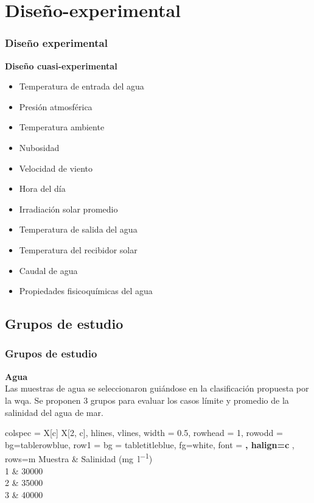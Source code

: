 \section{Diseño-experimental}
\begin{frame}
    \frametitle{Diseño experimental}
    \vspace*{2mm}
    \textbf{\large Diseño cuasi-experimental}\\[5mm]
    
    \begin{itemize}[columns=2]
	    \item Temperatura de entrada del agua
	    \item Presión atmosférica
	    \item Temperatura ambiente
	    \item Nubosidad
	    \item Velocidad de viento
	    \item Hora del día
	    \item Irradiación solar promedio
	    \item Temperatura de salida del agua
	    \item Temperatura del recibidor solar
	    \item Caudal de agua
	    \item Propiedades fisicoquímicas del agua
    \end{itemize}
\end{frame}

	\subsection{Grupos de estudio}

	\begin{frame}
	    \frametitle{Grupos de estudio}
	    \vspace*{2mm}
	    \textbf{\large Agua}\\[5mm]  
	    
	    Las muestras de agua se seleccionaron guiándose en la clasificación propuesta por la \acrfull{wqa}. Se proponen 3 grupos para evaluar los casos límite y promedio de la salinidad del agua de mar.
	      
	    \begin{longtblr}[
			caption = {Grupo de control del agua de mar},
			label = {table:grupo-control-agua}
		]{
			colspec = {X[c] X[2, c]},
			hlines,
			vlines,
			width = 0.5\linewidth,
			rowhead = 1,
			row{odd} = {bg=tablerowblue},
			row{1} = {
				bg = tabletitleblue,
				fg=white,
				font = \bfseries,
				halign=c
			},
			rows={m}
		}
			Muestra & Salinidad (\unit{\mg\per\litre})\\
			1 & \num{30000}\\
			2 & \num{35000}\\
			3 & \num{40000}
		\end{longtblr}
	\end{frame}
	
